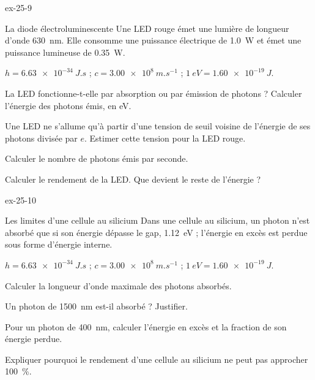 \begin{blocLivre}{ex-25-9}
\begin{exercice}[2]{La diode électroluminescente}
Une LED rouge émet une lumière de longueur d'onde \qty{630}{nm}. Elle consomme une puissance électrique de \qty{1,0}{W} et émet
une puissance lumineuse de \qty{0,35}{W}.
\begin{donnees}
$h=\qty{6,63e-34}{J.s}$ ; $c=\qty{3,00e8}{m.s^{-1}}$ ; $\qty{1}{eV}=\qty{1,60e-19}{J}$.
\end{donnees}
\begin{questions}
\item La LED fonctionne-t-elle par absorption ou par émission de photons ? Calculer l'énergie des photons émis, en eV.
\item Une LED ne s'allume qu'à partir d'une tension de seuil voisine de l'énergie de ses photons divisée par $e$. Estimer
cette tension pour la LED rouge.
\item Calculer le nombre de photons émis par seconde.
\item Calculer le rendement de la LED. Que devient le reste de l'énergie ?
\end{questions}
\end{exercice}
\end{blocLivre}
\begin{blocLivre}{ex-25-10}
\begin{exercice}[2]{Les limites d'une cellule au silicium}
Dans une cellule au silicium, un photon n'est absorbé que si son énergie dépasse le gap, \qty{1,12}{eV} ; l'énergie en
excès est perdue sous forme d'énergie interne.
\begin{donnees}
$h=\qty{6,63e-34}{J.s}$ ; $c=\qty{3,00e8}{m.s^{-1}}$ ; $\qty{1}{eV}=\qty{1,60e-19}{J}$.
\end{donnees}
\begin{questions}
\item Calculer la longueur d'onde maximale des photons absorbés.
\item Un photon de \qty{1500}{nm} est-il absorbé ? Justifier.
\item Pour un photon de \qty{400}{nm}, calculer l'énergie en excès et la fraction de son énergie perdue.
\item Expliquer pourquoi le rendement d'une cellule au silicium ne peut pas approcher 100~\%.
\end{questions}
\end{exercice}
\end{blocLivre}

